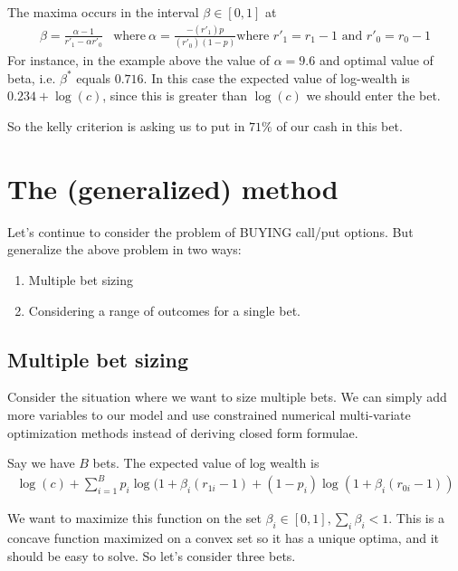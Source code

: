 \documentclass{article}
\begin{document}
The maxima occurs in the interval $\beta \in [0, 1]$ at 
\begin{align}
\beta  = \frac{\alpha - 1}{r'_1 - \alpha r'_0} &\text{where}\ \alpha = \frac{-(r'_1)p}{(r'_0)(1-p)} \text{where } r'_1 = r_1 - 1 \text{ and } r'_0 = r_0 - 1 
\end{align}
For instance, in the example above the value of $\alpha = 9.6$ and optimal value of beta, i.e. $\beta^*$ equals $0.716$. In this case the expected value of log-wealth is $0.234 + \log(c)$, since this is greater than $\log(c)$ we should enter the bet.


So the kelly criterion is asking us to put in $71\%$ of our cash in this bet.

\section{The (generalized) method}
Let's continue to consider the problem of BUYING call/put options. But generalize the above problem in two ways:
\begin{enumerate}
    \item Multiple bet sizing
    \item Considering a range of outcomes for a single bet.
\end{enumerate}

\subsection{Multiple bet sizing}
Consider the situation where we want to size multiple bets. We can simply add more variables to our model and use constrained numerical multi-variate optimization methods instead of deriving closed form formulae. 

Say we have $B$ bets. The expected value of log wealth is
\begin{align}
\log(c) + \sum_{i=1}^B p_i \log(1 + \beta_i (r_{1i} -1) + (1 -p_i) \log(1 + \beta_i (r_{0i} - 1))
\end{align}

We  want to maximize this function on the set $\beta_i \in [0, 1], \sum_i \beta_i < 1$. This is a concave function maximized on a convex set so it has a unique optima, and it should be easy to solve. So let's consider three bets.
\end{document}
